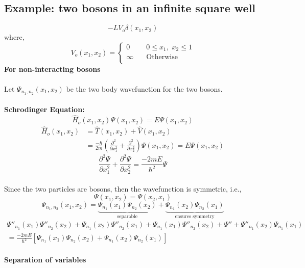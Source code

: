 \documentclass[12pt,fancychapters]{report}
\numberwithin{equation}{section}
\begin{document}
\subsection{Example: two bosons in an infinite square well}
\begin{equation*}
	-LV_o\delta(x_1, x_2)
\end{equation*}
where, 
\begin{equation*}
V_o(x_1, x_2)=\begin{cases}
          0 \quad & 0 \leq x_1,\,\,x_2 \leq 1 \\
					\infty \quad & \text{Otherwise} \\
     \end{cases}
\end{equation*}
\textbf{For non-interacting bosons}\\
\\
Let $\Psi_{n_1, n_2}(x_1, x_2)$ be the two body wavefunction for the two bosons.\\
\\
\textbf{Schrodinger Equation:}
\begin{equation*}
	\hat{H}_o(x_1, x_2)\Psi(x_1, x_2) = E\Psi(x_1, x_2)
\end{equation*}
\begin{align*}
	\hat{H}_o(x_1, x_2) &= \hat{T}(x_1,x_2) + \hat{V}(x_1,x_2)\\
	&= \frac{-\hbar}{2m}\left(\frac{\partial^2}{\partial x_1^2}+\frac{\partial^2}{\partial x_2^2}\right)
	\Psi(x_1,x_2) = E\Psi(x_1,x_2)
\end{align*}
\begin{equation*}
	\boxed{\frac{\partial^2\Psi}{\partial x_1^2}+\frac{\partial^2\Psi}{\partial x_2^2} = 
\frac{-2mE}{\hbar^2}\Psi}
\end{equation*}
\\
Since the two particles are bosons, then the wavefunction is symmetric, i.e., 
\[\Psi(x_1,x_2) = \Psi(x_2,x_1)\]
\[\Psi_{n_1,n_2}(x_1,x_2)=\underbrace{\Psi_{n_1}(x_1)\Psi_{n_2}(x_2)}_\text{separable}+
\underbrace{\Psi_{n_1}(x_2)\Psi_{n_2}(x_1)}_\text{ensures symmetry}\]
\begin{multline*}
\Psi''_{n_1}(x_1)\Psi''_{n_2}(x_2) + \Psi_{n_1}(x_2)\Psi''_{n_2}(x_1) + 
\Psi_{n_1}(x_1)\Psi''_{n_2}(x_2)+ \Psi''+\Psi''_{n_1}(x_2)\Psi_{n_1}(x_1)\\
= \frac{-2mE}{\hbar^2}\left[\Psi_{n_1}(x_1)\Psi_{n_2}(x_2)+\Psi_{n_1}(x_2)\Psi_{n_2}(x_1)\right]
\end{multline*}
\\
\textbf{Separation of variables}
\end{document}
